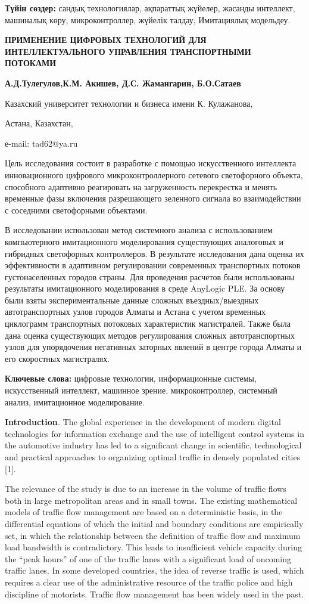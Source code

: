 \textbf{Түйін сөздер:} сандық технологиялар, ақпараттық жүйелер, жасанды
интеллект, машиналық көру, микроконтроллер, жүйелік талдау, Имитациялық
модельдеу.

\textbf{ПРИМЕНЕНИЕ ЦИФРОВЫХ ТЕХНОЛОГИЙ ДЛЯ ИНТЕЛЛЕКТУАЛЬНОГО УПРАВЛЕНИЯ
ТРАНСПОРТНЫМИ ПОТОКАМИ}

\textbf{А.Д.Тулегулов,К.М. Акишев, Д.С. Жамангарин, Б.О.Сатаев}

Казахский университет технологии и бизнеса имени К. Кулажанова,

Астана, Казахстан,

е-mail: tad62@ya.ru

Цель исследования состоит в разработке с помощью искусственного
интеллекта инновационного цифрового микроконтроллерного сетевого
светофорного объекта, способного адаптивно реагировать на загруженность
перекрестка и менять временные фазы включения разрешающего зеленного
сигнала во взаимодействии с соседними светофорными объектами.

В исследовании использован метод системного анализа с использованием
компьютерного имитационного моделирования существующих аналоговых и
гибридных светофорных контроллеров. В результате исследования дана
оценка их эффективности в адаптивном регулировании современных
транспортных потоков густонаселенных городов страны. Для проведения
расчетов были использованы результаты имитационного моделирования в
среде AnyLogic PLE. За основу были взяты экспериментальные данные
сложных въездных/выездных автотранспортных узлов городов Алматы и Астана
с учетом временных циклограмм транспортных потоковых характеристик
магистралей. Также была дана оценка существующих методов регулирования
сложных автотранспортных узлов для упорядочения негативных заторных
явлений в центре города Алматы и его скоростных магистралях.

\textbf{Ключевые слова:} цифровые технологии, информационные системы,
искусственный интеллект, машинное зрение, микроконтроллер, системный
анализ, имитационное моделирование.

\textbf{Introduction}\emph{.} The global experience in the development
of modern digital technologies for information exchange and the use of
intelligent control systems in the automotive industry has led to a
significant change in scientific, technological and practical approaches
to organizing optimal traffic in densely populated cities {[}1{]}.

The relevance of the study is due to an increase in the volume of
traffic flows both in large metropolitan areas and in small towns. The
existing mathematical models of traffic flow management are based on a
deterministic basis, in the differential equations of which the initial
and boundary conditions are empirically set, in which the relationship
between the definition of traffic flow and maximum load bandwidth is
contradictory. This leads to insufficient vehicle capacity during the
``peak hours'' of one of the traffic lanes with a significant load of
oncoming traffic lanes. In some developed countries, the idea of reverse
traffic is used, which requires a clear use of the administrative
resource of the traffic police and high discipline of motorists. Traffic
flow management has been widely used in the past.


